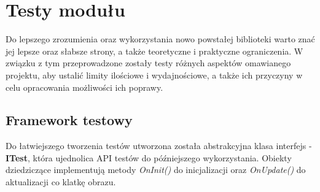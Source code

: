\chapter{Testy modułu}
	

	
	Do lepszego zrozumienia oraz wykorzystania nowo powstałej biblioteki warto znać jej lepsze oraz słabsze strony, a także teoretyczne i praktyczne ograniczenia. W związku z tym przeprowadzone zostały testy różnych aspektów omawianego projektu, aby ustalić limity ilościowe i wydajnościowe, a także ich przyczyny w celu opracowania możliwości ich poprawy.
	
	\section{Framework testowy}
	Do łatwiejszego tworzenia testów utworzona została abstrakcyjna klasa interfejs - \textbf{ITest}, która ujednolica API testów do późniejszego wykorzystania. Obiekty dziedziczące implementują metody \textit{OnInit()} do inicjalizacji oraz \textit{OnUpdate()} do aktualizacji co klatkę obrazu.
	
